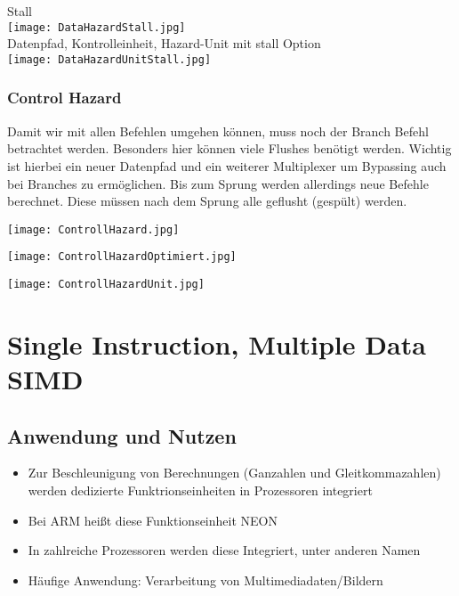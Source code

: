 				\begin{center}
					Stall \\
					\texttt{[image: DataHazardStall.jpg]} \\
					Datenpfad, Kontrolleinheit, Hazard-Unit mit stall Option \\
					\texttt{[image: DataHazardUnitStall.jpg]}
				\end{center}


			\subsubsection{Control Hazard}
				Damit wir mit allen Befehlen umgehen können, muss noch der Branch Befehl betrachtet werden.
				Besonders hier können viele Flushes benötigt werden. Wichtig ist hierbei ein neuer Datenpfad
				und ein weiterer Multiplexer um Bypassing auch bei Branches zu ermöglichen. Bis zum Sprung
				werden allerdings neue Befehle berechnet. Diese müssen nach dem Sprung alle geflusht (gespült) werden.
				 
				\begin{minipage}{0.5\textwidth}
					\begin{center}
						\texttt{[image: ControllHazard.jpg]}
					\end{center}
				\end{minipage}
				\begin{minipage}{0.45\textwidth}
					\begin{center}
						\texttt{[image: ControllHazardOptimiert.jpg]}
					\end{center}
				\end{minipage}
				\begin{center}
					\texttt{[image: ControllHazardUnit.jpg]}
				\end{center}



\newpage
\section{Single Instruction, Multiple Data SIMD}
	\subsection{Anwendung und Nutzen}
		\begin{itemize}
			\item Zur Beschleunigung von Berechnungen (Ganzahlen und Gleitkommazahlen) 
				werden dedizierte Funktrionseinheiten in Prozessoren integriert
			\item Bei ARM hei\ss t diese Funktionseinheit NEON
			\item In zahlreiche Prozessoren werden diese Integriert, unter anderen Namen
			\item Häufige Anwendung: Verarbeitung von Multimediadaten/Bildern
		\end{itemize}

